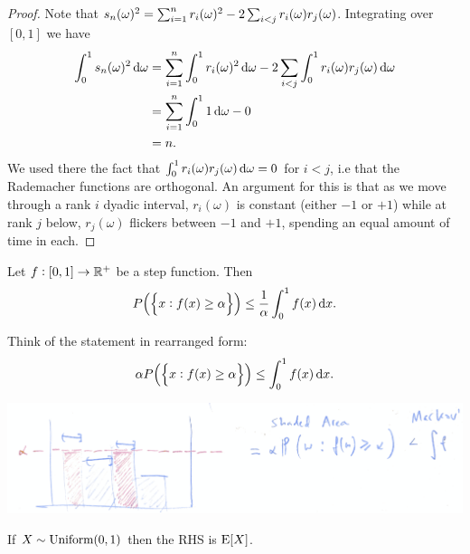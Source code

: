 \begin{proof}
  Note that $s_n(\omega)^2 = \sum_{i=1}^n r_i(\omega)^2 - 2\sum_{i<j}r_i(\omega)r_j(\omega)$. Integrating over $[0, 1]$ we have
  \begin{align*}
    \int_0^1 s_n(\om)^2 \d\om
    &= \sum_{i=1}^n \int_0^1 r_i(\om)^2 \d\om - 2\sum_{i<j}\int_0^1r_i(\om)r_j(\om) \d\om \\
    &= \sum_{i=1}^n \int_0^1 1 \d\om - 0 \\
    &= n.
  \end{align*}
  We used there the fact that $\int_0^1r_i(\om)r_j(\om) \d\om = 0$ for $i < j$, i.e that the Rademacher
  functions are orthogonal. An argument for this is that as we move through a rank $i$ dyadic
  interval, $r_i(\omega)$ is constant (either $-1$ or $+1$) while at rank $j$ below, $r_j(\omega)$ flickers
  between $-1$ and $+1$, spending an equal amount of time in each.
\end{proof}


\begin{lemma}
  Let $f: [0, 1] \to \mathbb{R}^+$ be a step function. Then
  \begin{align*}
    P\Big(\Big\{x: f(x) \geq \alpha\Big\}\Big) \leq \frac{1}{\alpha}\int_0^1 f(x) \dx.
  \end{align*}
\end{lemma}




\begin{intuition}
  Think of the statement in rearranged form:
  \begin{align*}
    \alpha P\Big(\Big\{x: f(x) \geq \alpha\Big\}\Big) \leq \int_0^1 f(x) \dx.
  \end{align*}



  \includegraphics[width=400pt]{img/analysis--real-analysis--measure-theory--weak-law-of-large-numbers-c9c2.png}

  If $X \sim \text{Uniform}(0, 1)$ then the RHS is $\operatorname{\text{E}}[X]$.

\end{intuition}


